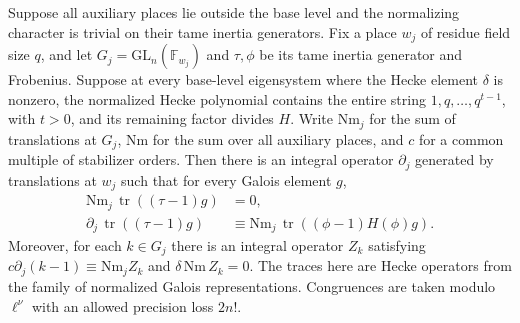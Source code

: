 \begin{lemma}
\label{lem:c-auxiliary-local-tie}
\emitthmsource
Suppose all auxiliary places lie outside the base level and the normalizing character is trivial on their tame inertia generators. Fix a place $w_j$ of residue field size $q$, and let $G_j=\mathrm{GL}_n(\mathbb F_{w_j})$ and $\tau,\phi$ be its tame inertia generator and Frobenius. Suppose at every base-level eigensystem where the Hecke element $\delta$ is nonzero, the normalized Hecke polynomial contains the entire string $1,q,\dots,q^{t-1}$, with $t>0$, and its remaining factor divides $H$. Write $\mathrm{Nm}_j$ for the sum of translations at $G_j$, $\mathrm{Nm}$ for the sum over all auxiliary places, and $c$ for a common multiple of stabilizer orders. Then there is an integral operator $\partial_j$ generated by translations at $w_j$ such that for every Galois element $g$,
\[
 \begin{aligned}
 \mathrm{Nm}_j\,\operatorname{tr}((\tau-1)g)&=0,\\
 \partial_j\,\operatorname{tr}((\tau-1)g)
 &\equiv \mathrm{Nm}_j\,\operatorname{tr}((\phi-1)H(\phi)g).
 \end{aligned}
\]
Moreover, for each $k\in G_j$ there is an integral operator $Z_k$ satisfying $c\partial_j(k-1)\equiv\mathrm{Nm}_jZ_k$ and $\delta\,\mathrm{Nm}\,Z_k=0$. The traces here are Hecke operators from the family of normalized Galois representations. Congruences are taken modulo $\ell^\nu$ with an allowed precision loss $2n!$.
\end{lemma}

